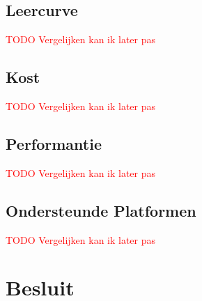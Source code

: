 \documentclass[a4paper]{IEEEconf}
\newcommand{\TODO}[1]{\textcolor{red}{TODO #1}}
\begin{document}
\subsection{Leercurve}

\TODO{Vergelijken kan ik later pas}

\subsection{Kost}

\TODO{Vergelijken kan ik later pas}

\subsection{Performantie}

\TODO{Vergelijken kan ik later pas}

\subsection{Ondersteunde Platformen}

\TODO{Vergelijken kan ik later pas}

\section{Besluit}

\printbibliography
\end{document}
